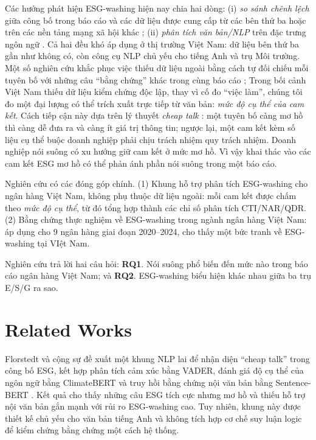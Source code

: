 \documentclass[runningheads]{llncs}
\begin{document}
Các hướng phát hiện ESG-washing hiện nay chia hai dòng: (i) \emph{so sánh chênh lệch} giữa công bố trong báo cáo và các dữ liệu được cung cấp từ các bên thứ ba hoặc trên các nền tảng mạng xã hội khác \cite{su16062571,ghitti2024agency,kathan2025you}; (ii) \emph{phân tích văn bản/NLP} trên đặc trưng ngôn ngữ \cite{lagasio2024esg,lipenkova2023detecting,bingler2022cheap}. Cả hai đều khó áp dụng ở thị trường Việt Nam: dữ liệu bên thứ ba gần như không có, còn công cụ NLP chủ yếu cho tiếng Anh và trụ Môi trường. Một số nghiên cứu khắc phục việc thiếu dữ liệu ngoài bằng cách tự đối chiếu mỗi tuyên bố với những câu ``bằng chứng'' khác trong cùng báo cáo \cite{florstedt2025detecting}; Trong bối cảnh Việt Nam thiếu dữ liệu kiểm chứng độc lập, thay vì cố đo ``việc làm'', chúng tôi đo một đại lượng có thể trích xuất trực tiếp từ văn bản: \emph{mức độ cụ thể của cam kết}. Cách tiếp cận này dựa trên lý thuyết \emph{cheap talk} \cite{farrell1996cheap}: một tuyên bố càng mơ hồ thì càng dễ đưa ra và càng ít giá trị thông tin; ngược lại, một cam kết kèm số liệu cụ thể buộc doanh nghiệp phải chịu trách nhiệm quy trách nhiệm. Doanh nghiệp nói suông có xu hướng giữ cam kết ở mức mơ hồ. Vì vậy khai thác vào các cam kết ESG mơ hồ có thể phản ánh phần nói suông trong một báo cáo.

Nghiên cứu có các đóng góp chính. (1) Khung hỗ trợ phân tích ESG-washing cho ngân hàng Việt Nam, không phụ thuộc dữ liệu ngoài: mỗi cam kết được chấm theo \emph{mức độ cụ thể}, từ đó tổng hợp thành các chỉ số phân tích CTI/NAR/QDR. (2) Bằng chứng thực nghiệm về ESG-washing trong ngành ngân hàng Việt Nam: áp dụng cho 9 ngân hàng giai đoạn 2020--2024, cho thấy một bức tranh về ESG-washing tại VIệt Nam.

Nghiên cứu trả lời hai câu hỏi: \textbf{RQ1}. Nói suông phổ biến đến mức nào trong báo cáo ngân hàng Việt Nam; và \textbf{RQ2}. ESG-washing biểu hiện khác nhau giữa ba trụ E/S/G ra sao.

\section{Related Works}
Florstedt và cộng sự \cite{florstedt2025detecting} đề xuất một khung NLP lai để nhận diện ``cheap talk'' trong công bố ESG, kết hợp phân tích cảm xúc bằng VADER, đánh giá độ cụ thể của ngôn ngữ bằng ClimateBERT \cite{webersinke2021climatebert} và truy hồi bằng chứng nội văn bản bằng Sentence-BERT \cite{reimers2019sentence}. Kết quả cho thấy những câu ESG tích cực nhưng mơ hồ và thiếu hỗ trợ nội văn bản gắn mạnh với rủi ro ESG-washing cao. Tuy nhiên, khung này được thiết kế chủ yếu cho văn bản tiếng Anh và không tích hợp cơ chế suy luận logic để kiểm chứng bằng chứng một cách hệ thống.
\end{document}
